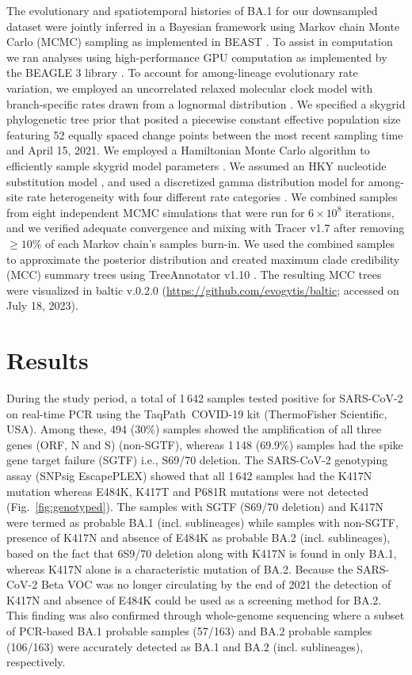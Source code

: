 The evolutionary and spatiotemporal histories of BA.1 for our downsampled dataset were jointly inferred in a Bayesian framework using Markov chain Monte Carlo (MCMC) sampling as implemented in BEAST \citep{suchard2018bayesian}.
To assist in computation we ran analyses using high-performance GPU computation as implemented by the BEAGLE 3 library \citep{baele2019high,ayres2019beagle}.
To account for among-lineage evolutionary rate variation, we employed an uncorrelated relaxed molecular clock model with branch-specific rates drawn from a lognormal distribution \citep{drummond2006relaxed}.
We specified a skygrid phylogenetic tree prior \citep{gill2013improving} that posited a piecewise constant effective population size featuring 52 equally spaced change points between the most recent sampling time and April 15, 2021.
We employed a Hamiltonian Monte Carlo algorithm to efficiently sample skygrid model parameters \citep{baele2020hamiltonian}.
We assumed an HKY nucleotide substitution model \citep{hasegawa1985dating}, and used a discretized gamma distribution model for among-site rate heterogeneity with four different rate categories \citep{yang1994maximum}.
We combined samples from eight independent MCMC simulations that were run for $6\times10^8$ iterations, and we verified adequate convergence and mixing with Tracer v1.7 \citep{rambaut2018posterior} after removing $\geq10\%$ of each Markov chain's samples burn-in.
We used the combined samples to approximate the posterior distribution and created maximum clade credibility (MCC) summary trees using TreeAnnotator v1.10 \citep{suchard2018bayesian}.
The resulting MCC trees were visualized in baltic v.0.2.0 (\url{https://github.com/evogytis/baltic}; accessed on July 18, 2023).


\section{Results}\label{2:sec-res}
During the study period, a total of 1\,642 samples tested positive for SARS-CoV-2 on real-time PCR using the TaqPath\texttrademark\ COVID-19 kit (ThermoFisher Scientific, USA).
Among these, 494 (30\%) samples showed the amplification of all three genes (ORF, N and S) (non-SGTF), whereas 1\,148 (69.9\%) samples had the spike gene target failure (SGTF) i.e., S69/70 deletion.
The SARS-CoV-2 genotyping assay (SNPsig EscapePLEX) showed that all 1\,642 samples had the K417N mutation whereas E484K, K417T and P681R mutations were not detected (Fig.~\ref{fig:genotyped}).
The samples with SGTF (S69/70 deletion) and K417N were termed as probable BA.1 (incl. sublineages) while samples with non-SGTF, presence of K417N and absence of E484K as probable BA.2 (incl. sublineages), based on the fact that 6S9/70 deletion along with K417N is found in only BA.1, whereas K417N alone is a characteristic mutation of BA.2.
Because the SARS-CoV-2 Beta VOC was no longer circulating by the end of 2021 the detection of K417N and absence of E484K could be used as a screening method for BA.2.
This finding was also confirmed through whole-genome sequencing where a subset of PCR-based BA.1 probable samples (57/163) and BA.2 probable samples (106/163) were accurately detected as BA.1 and BA.2 (incl. sublineages), respectively.

